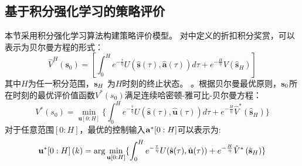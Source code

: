 \subsection{基于积分强化学习的策略评价}
\label{sec:ctirl}
本节采用积分强化学习算法\cite{Guo2019}构建策略评价模型。
对中定义的折扣积分奖赏，可以表示为贝尔曼方程的形式：
\begin{equation}
  \hat{V}^{H}\left(\mathbf{s}_{0}\right)=\left[\int_{0}^{H} e^{-\frac{\tau}{\eta}} U(\hat{\mathbf{s}}(\tau), \hat{\mathbf{a}}(\tau)) d \tau+e^{-\frac{H}{\eta}} {V}\left(\hat{\mathbf{s}}_{H}\right)\right]
  \label{equ:J_bellman}
\end{equation}
其中$H$为任一积分范围，$\mathbf s_H$ 为$H$时刻的终止状态。
。根据贝尔曼最优原则，$\mathbf s_0$所在时刻的最优评价值函数$V^*(s_0)$满足连续哈密顿-雅可比-贝尔曼方程：
\begin{equation}
\label{equ:J_star} 
V ^ { * } \left( s_0 \right) = \min _{ \mathbf u[0:H ] } \{ \int_0^H e^{-\frac{\tau}{\eta}} U(\hat{\mathbf{s}}(\tau), \hat{\mathbf{u}}(\tau)) d\tau  + e^{-\frac{H}{\eta}} \hat{V}^*\left(\hat{\mathbf{s}}_{H}\right)\}
\end{equation}
对于任意范围$[0:H]$，最优的控制输入$\mathbf a^*[0:H]$可以表示为:
\begin{equation}
\mathbf u^*[  0:H ] \left( k \right) =\arg \min _ { \mathbf u[0:H ] }\{ \int_0^H e^{-\frac{\tau}{\eta}} U(\hat{\mathbf{s}}(\tau), \hat{\mathbf{u}}(\tau))  + e^{-\frac{H}{\eta}} \hat{V}^*\left(\hat{\mathbf{s}}_{H}\right)\}
\label{equ:VI_u}
\end{equation}


